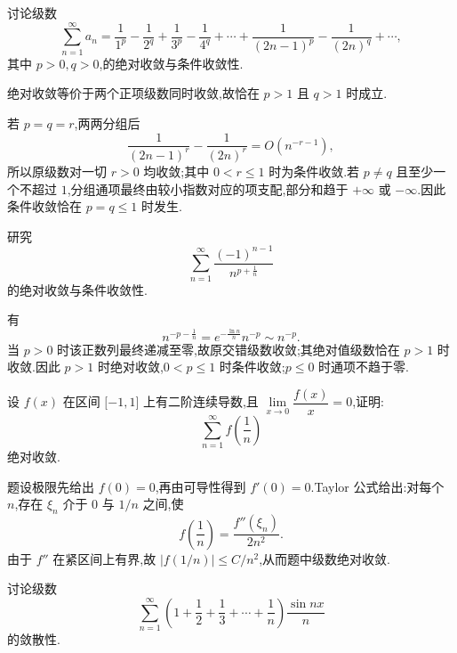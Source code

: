 \begin{example}
    讨论级数
    \[
        \displaystyle\sum\limits_{n=1}^{\infty}a_n
        =\dfrac{1}{1^p}-\dfrac{1}{2^q}+\dfrac{1}{3^p}-\dfrac{1}{4^q}+
        \cdots+\dfrac{1}{(2n-1)^p}-\dfrac{1}{(2n)^q}+\cdots,
    \]
    其中 $p>0,q>0$,的绝对收敛与条件收敛性.
\end{example}
\exampleblank

\begin{solution}
    绝对收敛等价于两个正项级数同时收敛,故恰在 $p>1$ 且 $q>1$ 时成立.

    若 $p=q=r$,两两分组后
    \[
        \dfrac{1}{(2n-1)^r}-\dfrac{1}{(2n)^r}=O(n^{-r-1}),
    \]
    所以原级数对一切 $r>0$ 均收敛;其中 $0<r\leq1$ 时为条件收敛.若
    $p\neq q$ 且至少一个不超过 $1$,分组通项最终由较小指数对应的项支配,部分和趋于 $+\infty$ 或 $-\infty$.因此条件收敛恰在 $p=q\leq1$ 时发生.
\end{solution}

\begin{example}
    研究
    \[
        \displaystyle\sum\limits_{n=1}^{\infty}\dfrac{(-1)^{n-1}}{n^{p+\frac{1}{n}}}
    \]
    的绝对收敛与条件收敛性.
\end{example}
\exampleblank

\begin{solution}
    有
    \[
        n^{-p-\frac{1}{n}}=e^{-\frac{\ln n}{n}}n^{-p}\sim n^{-p}.
    \]
    当 $p>0$ 时该正数列最终递减至零,故原交错级数收敛;其绝对值级数恰在 $p>1$ 时收敛.因此 $p>1$ 时绝对收敛,$0<p\leq1$ 时条件收敛;$p\leq0$ 时通项不趋于零.
\end{solution}

\begin{example}
    设 $f(x)$ 在区间 $\lbrack -1,1\rbrack$ 上有二阶连续导数,且 $\displaystyle\lim\limits_{x\to0}\dfrac{f(x)}{x}=0$,证明:
    \[
        \displaystyle\sum\limits_{n=1}^{\infty}f\left(\dfrac{1}{n}\right)
    \]
    绝对收敛.
\end{example}
\exampleblank

\begin{solution}
    题设极限先给出 $f(0)=0$,再由可导性得到 $f'(0)=0$.Taylor 公式给出:对每个 $n$,存在 $\xi_n$ 介于 $0$ 与 $1/n$ 之间,使
    \[
        f\left(\dfrac{1}{n}\right)=\dfrac{f''(\xi_n)}{2n^2}.
    \]
    由于 $f''$ 在紧区间上有界,故 $|f(1/n)|\leq C/n^2$,从而题中级数绝对收敛.
\end{solution}

\begin{example}
    讨论级数
    \[
        \displaystyle\sum\limits_{n=1}^{\infty}\left(1+\dfrac{1}{2}+\dfrac{1}{3}+\cdots+\dfrac{1}{n}\right)\dfrac{\sin nx}{n}
    \]
    的敛散性.
\end{example}
\exampleblank

